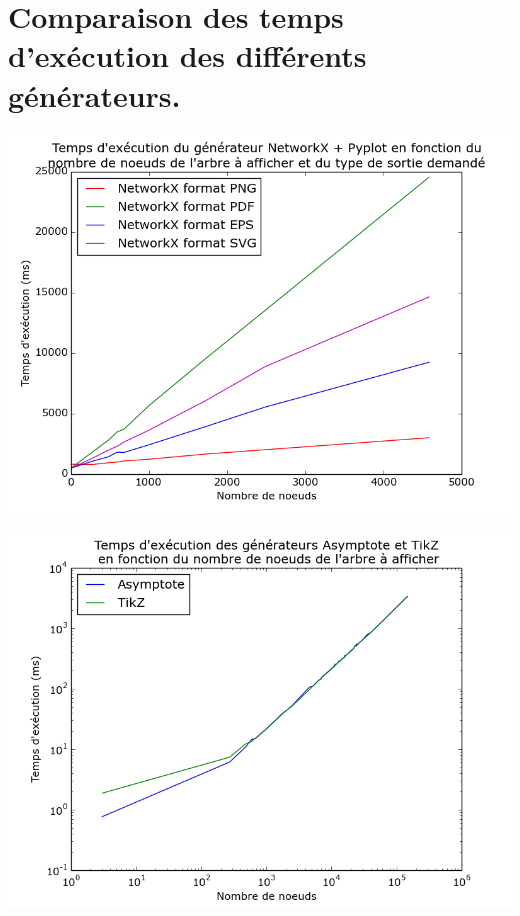 	\section{Comparaison des temps d'exécution des différents générateurs.}
	
\begin{center}

\includegraphics[width=\columnwidth]{execTimeNX}

\end{center}
	
\begin{center}

\includegraphics[width=\columnwidth]{execTimeGenerators}

\end{center}

